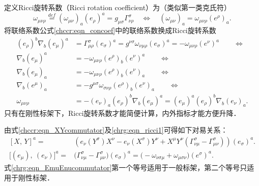 定义{\heiti Ricci旋转系数}（Ricci rotation coefficient）为（类似第一类克氏符）
\begin{equation}\label{chrg:eqn_ricci0}
    \omega_{\mu\nu\rho} \overset{def}{=} (\omega_{\mu\nu})_a (e_\rho)^{a}
    =g_{\mu\sigma}\Gamma^{\sigma}_{\nu\rho}
    {\quad \Leftrightarrow \quad}
    (\omega_{\mu\nu})_a  = \omega_{\mu\nu\rho} (e^\rho)_{a} .
\end{equation}
将联络系数公式\eqref{chccr:eqn_concoef}中的联络系数换成Ricci旋转系数
\begin{align}
    (e_\rho)^b \nabla _b (e_\mu)^a & = \Gamma^{\sigma}_{\mu\rho} (e_\sigma)^a
    = g^{\nu\sigma}\omega_{\nu\mu\rho} (e_\sigma)^a =-\omega_{\mu\nu\rho} (e^\nu)^a
    {\qquad \Leftrightarrow }  \label{chrg:eqn_ricci1} \\
    \nabla _b (e_\mu)^a & = -\omega_{\mu\nu\rho} (e^\rho)_b (e^\nu)^a
    {\qquad \Leftrightarrow }  \label{chrg:eqn_ricci2} \\
    \nabla _b (e_\mu)_a &  = -\omega_{\mu\nu\rho}(e^\rho)_b (e^\nu)_a
    {\qquad \Leftrightarrow }  \label{chrg:eqn_ricci3}  \\
    \nabla _b (e^\mu)_a & = -g^{\mu\sigma}\omega_{\sigma\nu\rho}(e^\rho)_b (e^\nu)_a
    {\qquad \Leftrightarrow }  \label{chrg:eqn_ricci4}  \\
    \omega_{\mu\nu\rho} & = -(e_\nu)_a (e_\rho)^b \nabla _b (e_\mu)^a
    = (e_\mu)^a  (e_\rho)^b \nabla _b (e_\nu)_a . \label{chrg:eqn_ricci5}
\end{align}
只有在刚性标架下，Ricci旋转系数才能简便计算，内外指标才能方便升降．


由式\eqref{chccr:eqn_XYcommutator}及\eqref{chrg:eqn_ricci1}可得如下对易关系：
\begin{align}
    \left[ X,\, Y \right]^a =&\left(e_\nu (Y^\sigma)X^\nu  -  e_\nu (X^\sigma) Y^\nu
    + X^\mu Y^\nu ( \Gamma^{\sigma}_{\nu\mu} - \Gamma^{\sigma}_{\mu\nu}) \right)(e_\sigma)^a .
      \label{chrg:eqn_XYcommutator-Ebase} \\
    \bigl[(e_\mu),\ (e_\nu)\bigr]^a
    =& \bigl(\Gamma^{\sigma}_{\nu\mu} - \Gamma^{\sigma}_{\mu\nu}\bigr) (e_\sigma)^a
    = \bigl(-\omega_{\nu\sigma\mu} + \omega_{\mu\sigma\nu}\bigr) (e^\sigma)^a .
      \label{chrg:eqn_EmuEnucommutator}
\end{align}
式\eqref{chrg:eqn_EmuEnucommutator}第一个等号适用于一般标架，第二个等号只适用于刚性标架． %

